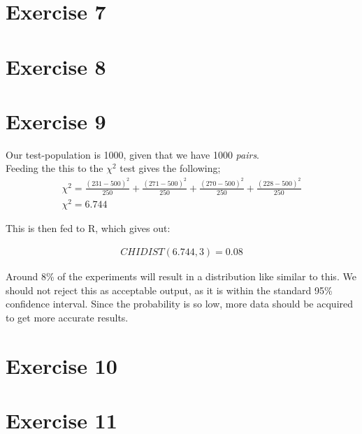 \documentclass[10pt,a4paper]{article}
\begin{document}
\section*{Exercise 7}
\section*{Exercise 8}
\section*{Exercise 9}
Our test-population is 1000, given that we have 1000 \emph{pairs}.\\
Feeding the this to the $\chi^2$ test gives the following;
\begin{eqnarray}
\chi^2 = \frac{\left(231 - 500\right)^2}{250} + 
         \frac{\left(271 - 500\right)^2}{250} + 
         \frac{\left(270 - 500\right)^2}{250} + 
         \frac{\left(228 - 500\right)^2}{250} \\
\chi^2 = 6.744
\end{eqnarray}

This is then fed to R, which gives out:

\begin{eqnarray}
CHIDIST \left(6.744,3\right) = 0.08
\end{eqnarray}

Around 8\% of the experiments will result in a distribution like similar to this. We should not reject this as acceptable output, as it is within the standard 95\% confidence interval. Since the probability is so low, more data should be acquired to get more accurate results.

\section*{Exercise 10}
\section*{Exercise 11}
\end{document}
